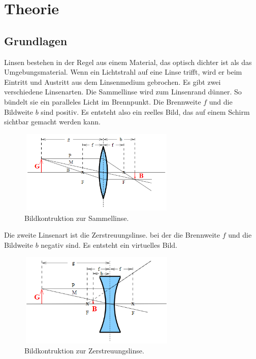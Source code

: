 \section{Theorie}
\label{sec:Theorie}
\subsection{Grundlagen}
Linsen bestehen in der Regel aus einem Material, das optisch dichter ist als das Umgebungsmaterial. Wenn ein Lichtstrahl auf eine Linse trifft, wird er beim Eintritt und
Austritt aus dem Linsenmedium gebrochen. Es gibt zwei verschiedene Linsenarten. Die
Sammellinse wird zum Linsenrand dünner. So bündelt sie ein paralleles Licht im Brennpunkt. Die Brennweite $f$ und die Bildweite $b$ sind positiv. Es entsteht also ein reelles
Bild, das auf einem Schirm sichtbar gemacht werden kann.
\begin{figure}[H]
   \begin{center}
   \includegraphics[width = 7.5cm, height= 4cm]{Sammellinse.png}
   \caption{Bildkontruktion zur Sammellinse.\protect\cite{AL}}
   \end{center}
   \label{fig:Sammellinse}
   \end{figure}
   \noindent
Die zweite Linsenart ist die Zerstreuungslinse. bei der die Brennweite $f$ und die Bildweite
$b$ negativ sind. Es entsteht ein virtuelles Bild.
\begin{figure}[H]
   \begin{center}
   \includegraphics[width = 7.5cm, height= 4.5cm]{Zerstreuungslinse.png}
   \caption{Bildkontruktion zur Zerstreuungslinse.\protect\cite{AL}}
   \end{center}
   \label{fig:Zerstreuungslinse}
   \end{figure}
